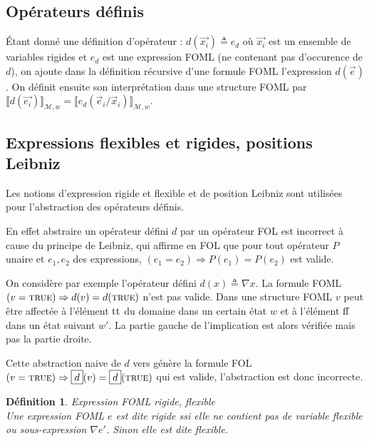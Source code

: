 \documentclass[12pt]{article}
\newcommand{\false}{\textup{ff}}
\newcommand{\true}{\textup{tt}}
\newcommand{\M}{\ensuremath{\mathcal{M}}}
\newcommand{\bpar}[1]{\marginpar{\color{myblue}\footnotesize\raggedright#1}}
\newcommand{\TRUE}{\textsc{true}}
\newtheorem{defin}{Définition}
\begin{document}
\subsection{Opérateurs définis}

Étant donné une définition d'opérateur : $d(\vec{x_i}) \triangleq e_d$ où $\vec{x_i}$ est un ensemble de variables rigides et $e_d$ est une expression FOML (ne contenant pas d'occurence de $d$), on ajoute dans la définition récursive d'une formule FOML l'expression $d(\vec{e})$.
On définit ensuite son interprétation dans une structure FOML par %
$\llbracket d(\vec{e_i}) \rrbracket_{\M, w} = \llbracket e_d(\vec{e}_i/\vec{x}_i) \rrbracket_{\M, w}$.

\subsection{Expressions flexibles et rigides, positions Leibniz}

Les notions d'expression rigide et flexible et de position Leibniz sont utilisées pour l'abstraction des opérateurs définis.

En effet abstraire un opérateur défini $d$ par un opérateur FOL  est incorrect à cause du principe de Leibniz, qui affirme en FOL que pour tout opérateur $P$ unaire et $e_1, e_2$ des expressions, $(e_1 = e_2) \Rightarrow P(e_1) = P(e_2)$ est valide.

On considère par exemple l'opérateur défini $d(x) \triangleq \nabla x$.
La formule FOML $(v = \TRUE) \Rightarrow d(v) = d(\TRUE)$ n'est pas valide.
Dans une structure FOML $v$ peut être affectée à l'élément $\true$ du domaine dans un certain état $w$
et à l'élément $\false$ dans un état suivant $w'$.
La partie gauche de l'implication est alors vérifiée mais pas la partie droite.

Cette abstraction naive de $d$ vers  génère la formule FOL
\( (v = \TRUE) \Rightarrow \fbox{$d$}(v) = \fbox{$d$}(\TRUE) \) qui est valide, l'abstraction est donc incorrecte.


\begin{defin} \emph{Expression FOML rigide, flexible} \\
  Une expression FOML $e$ est dite rigide ssi elle ne contient pas de variable flexible ou sous-expression $\nabla e'$.
  Sinon elle est dite flexible.
\end{defin}
\end{document}
